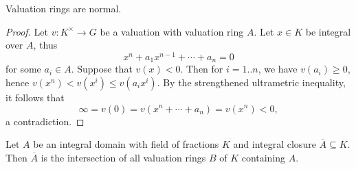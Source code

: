 \documentclass[reqno]{amsart}
\begin{document}
\begin{lemma}
Valuation rings are normal.
\end{lemma}
\begin{proof}
  Let $v : K^\times  \rightarrow G$ be a valuation
  with valuation ring $A$.
  Let $x \in K$ be integral over $A$,
  thus
  \[
    x^n + a_1 x^{n-1} + \dotsb + a_n = 0
  \]
  for some $a_i \in A$.
  Suppose that $v(x) < 0$.
  Then for $i=1..n$,
  we have $v(a_i) \geq 0$,
  hence $v(x^n) < v(x^{i}) \leq v(a_i x^i)$.
  By the strengthened ultrametric inequality,
  it follows that
  \[
    \infty = v(0) = v(x^n + \dotsb + a_n) = v(x^n) < 0,
  \]
  a contradiction.
\end{proof}

\begin{theorem}
  Let $A$ be an integral domain with field of fractions $K$
  and integral closure $\overline{A} \subseteq K$.
  Then $\overline{A}$ is the intersection of all valuation rings
  $B$ of $K$ containing $A$.
\end{theorem}
\end{document}
